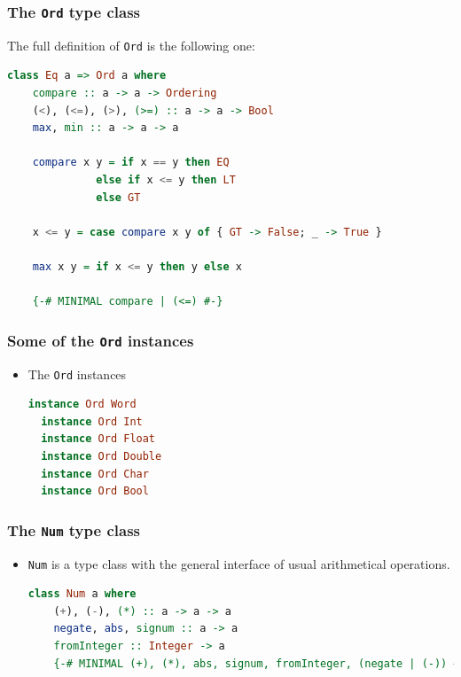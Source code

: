 \documentclass[10pt,pdf,utf8,russian,aspectratio=169]{beamer}
\begin{document}
\begin{frame}[fragile]
  \frametitle{The \verb"Ord" type class}

The full definition of \verb"Ord" is the following one:

  \begin{lstlisting}[language=Haskell]
  class Eq a => Ord a where
    compare :: a -> a -> Ordering
    (<), (<=), (>), (>=) :: a -> a -> Bool
    max, min :: a -> a -> a

    compare x y = if x == y then EQ
              else if x <= y then LT
              else GT

    x <= y = case compare x y of { GT -> False; _ -> True }

    max x y = if x <= y then y else x

    {-# MINIMAL compare | (<=) #-}
  \end{lstlisting}
\end{frame}

\begin{frame}[fragile]
  \frametitle{Some of the \verb"Ord" instances}

\begin{itemize}
  \item The \verb"Ord" instances
\begin{lstlisting}[language=Haskell]
  instance Ord Word
  instance Ord Int
  instance Ord Float
  instance Ord Double
  instance Ord Char
  instance Ord Bool
\end{lstlisting}
\end{itemize}
\end{frame}

\begin{frame}[fragile]
  \frametitle{The \verb"Num" type class}

\begin{itemize}
  \item \verb"Num" is a type class with the general interface of usual arithmetical operations.
  \begin{lstlisting}[language=Haskell]
  class Num a where
    (+), (-), (*) :: a -> a -> a
    negate, abs, signum :: a -> a
    fromInteger :: Integer -> a
    {-# MINIMAL (+), (*), abs, signum, fromInteger, (negate | (-)) #-}
  \end{lstlisting}
   
\end{itemize}
\end{frame}
\end{document}
